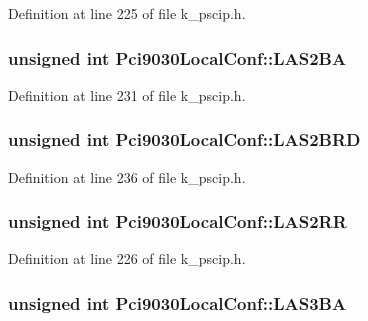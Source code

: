 Definition at line 225 of file k\_\-pscip.h.\hypertarget{struct_pci9030_local_conf_949a05ceff57440b0ce18bde68b201a6}{
\subsubsection[{LAS2BA}]{\setlength{\rightskip}{0pt plus 5cm}unsigned int {\bf Pci9030LocalConf::LAS2BA}}}
\label{struct_pci9030_local_conf_949a05ceff57440b0ce18bde68b201a6}




Definition at line 231 of file k\_\-pscip.h.\hypertarget{struct_pci9030_local_conf_759ce80b48bd4c6932afda2b812eecb5}{
\subsubsection[{LAS2BRD}]{\setlength{\rightskip}{0pt plus 5cm}unsigned int {\bf Pci9030LocalConf::LAS2BRD}}}
\label{struct_pci9030_local_conf_759ce80b48bd4c6932afda2b812eecb5}




Definition at line 236 of file k\_\-pscip.h.\hypertarget{struct_pci9030_local_conf_164309e1f88bea53b0348dad8d916914}{
\subsubsection[{LAS2RR}]{\setlength{\rightskip}{0pt plus 5cm}unsigned int {\bf Pci9030LocalConf::LAS2RR}}}
\label{struct_pci9030_local_conf_164309e1f88bea53b0348dad8d916914}




Definition at line 226 of file k\_\-pscip.h.\hypertarget{struct_pci9030_local_conf_fb520b44e813e57b8d81adf88fcf5d2c}{
\subsubsection[{LAS3BA}]{\setlength{\rightskip}{0pt plus 5cm}unsigned int {\bf Pci9030LocalConf::LAS3BA}}}
\label{struct_pci9030_local_conf_fb520b44e813e57b8d81adf88fcf5d2c}




